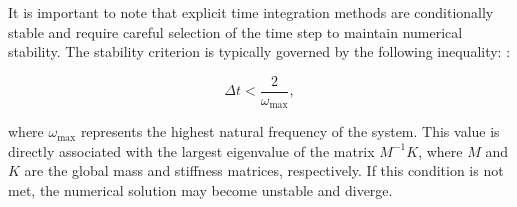 \documentclass{article}
\begin{document}
	
	It is important to note that explicit time integration methods are conditionally stable and require careful selection of the time step to maintain numerical stability. The stability criterion is typically governed by the following inequality:
	:
	
	\begin{equation}
		\Delta t < \frac{2}{\omega_{\max}},
	\end{equation}
	
	where \( \omega_{\max} \) represents the highest natural frequency of the system. This value is directly associated with the largest eigenvalue of the matrix \( {M}^{-1} {K} \), where \( {M} \) and \( {K} \) are the global mass and stiffness matrices, respectively. If this condition is not met, the numerical solution may become unstable and diverge.
	
\end{document}
